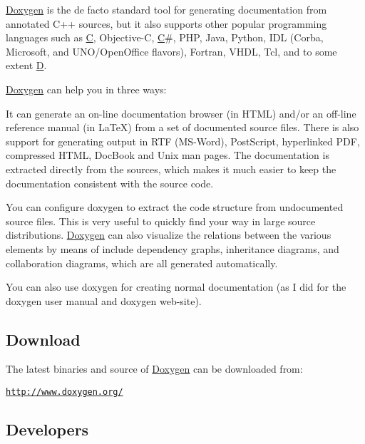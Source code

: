 \hyperlink{class_doxygen}{Doxygen} is the de facto standard tool for generating documentation from annotated C++ sources, but it also supports other popular programming languages such as \hyperlink{class_c}{C}, Objective-\/\-C, \hyperlink{class_c}{C}\#, P\-H\-P, Java, Python, I\-D\-L (Corba, Microsoft, and U\-N\-O/\-Open\-Office flavors), Fortran, V\-H\-D\-L, Tcl, and to some extent \hyperlink{class_d}{D}.

\hyperlink{class_doxygen}{Doxygen} can help you in three ways\-:


\begin{DoxyEnumerate}
\item It can generate an on-\/line documentation browser (in H\-T\-M\-L) and/or an off-\/line reference manual (in La\-Te\-X) from a set of documented source files. There is also support for generating output in R\-T\-F (M\-S-\/\-Word), Post\-Script, hyperlinked P\-D\-F, compressed H\-T\-M\-L, Doc\-Book and Unix man pages. The documentation is extracted directly from the sources, which makes it much easier to keep the documentation consistent with the source code.
\item You can configure doxygen to extract the code structure from undocumented source files. This is very useful to quickly find your way in large source distributions. \hyperlink{class_doxygen}{Doxygen} can also visualize the relations between the various elements by means of include dependency graphs, inheritance diagrams, and collaboration diagrams, which are all generated automatically.
\item You can also use doxygen for creating normal documentation (as I did for the doxygen user manual and doxygen web-\/site).
\end{DoxyEnumerate}

\subsection*{Download }

The latest binaries and source of \hyperlink{class_doxygen}{Doxygen} can be downloaded from\-:
\begin{DoxyItemize}
\item \href{http://www.doxygen.org/}{\tt http\-://www.\-doxygen.\-org/}
\end{DoxyItemize}

\subsection*{Developers }


